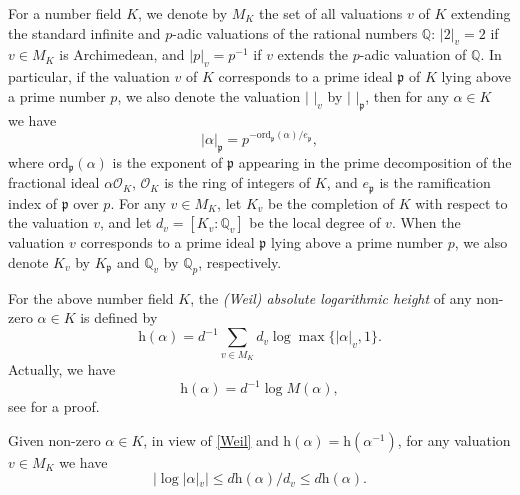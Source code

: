 \documentclass[12pt]{amsart}
\theoremstyle{definition}
\theoremstyle{remark}
\numberwithin{equation}{section}
\begin{document}
For a number field $K$, we denote by $M_{K}$ the set of all valuations $v$ of $K$ extending the standard infinite and
$p$-adic valuations of the rational numbers ${{\mathbb Q}}$: $|2|_{v}=2$ if $v\in M_{K}$ is Archimedean, and $|p|_{v}=p^{-1}$ if $v$ extends the $p$-adic valuation of ${{\mathbb Q}}$. In particular, if the valuation $v$ of $K$ corresponds to a prime ideal ${\mathfrak{p}}$ of $K$ lying above a prime number $p$, we also denote the valuation $|\,\,|_v$ by $|\,\,|_{\mathfrak{p}}$, then for any ${\alpha} \in K$ we have
$$
|{\alpha}|_{\mathfrak{p}} = p^{-{\mathrm{ord}}_{\mathfrak{p}}({\alpha})/e_{\mathfrak{p}}},
$$
where ${\mathrm{ord}}_{\mathfrak{p}}({\alpha})$ is the exponent of ${\mathfrak{p}}$ appearing in the prime decomposition of the fractional ideal ${\alpha} {{\mathcal O}}_K$, ${{\mathcal O}}_K$ is the ring of integers of $K$,  and $e_{\mathfrak{p}}$ is the ramification index of ${\mathfrak{p}}$ over $p$.
For any $v\in M_{K}$, let $K_{v}$ be the completion of $K$ with respect to the valuation $v$, and
let $d_{v}=[K_{v}:{{\mathbb Q}}_{v}]$ be the local degree of $v$. When the valuation $v$ corresponds to a prime ideal ${\mathfrak{p}}$ lying above a prime number $p$, we also denote $K_v$ by $K_{\mathfrak{p}}$ and ${{\mathbb Q}}_v$ by ${{\mathbb Q}}_p$, respectively. 

For the above number field $K$, the \emph{(Weil) absolute logarithmic height} of any non-zero $\alpha\in K$ is
defined by
\begin{equation}
\label{Weil}
{\mathrm{h}}(\alpha)=d^{-1}\sum_{v\in M_{K}}d_{v}\log\max\{|\alpha|_{v},1\}.
\end{equation}
 Actually, we have
\begin{equation}
\label{Mahler-Weil}
 {\mathrm{h}}({\alpha})= d^{-1} \log M({\alpha}),
\end{equation}
see \cite[Lemma 3.10]{Waldschmidt} for a proof. 

Given non-zero ${\alpha} \in K$, in view of \eqref{Weil} and ${\mathrm{h}}({\alpha})={\mathrm{h}}({\alpha}^{-1})$, for any valuation $v\in M_K$ we have 
\begin{equation}
\label{Liouville}
| \log |{\alpha} |_v | \le d{\mathrm{h}}({\alpha})/d_v \le d{\mathrm{h}}({\alpha}).
\end{equation}
\end{document}
